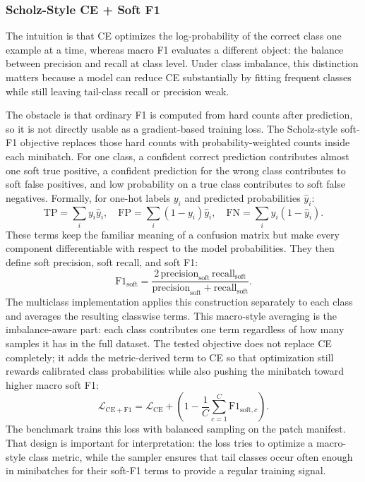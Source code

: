 \documentclass[11pt]{article}
\begin{document}
\subsubsection{Scholz-Style CE + Soft F1}
The intuition is that CE optimizes the log-probability of the correct class one example at a time, whereas macro F1 evaluates a different object: the balance between precision and recall at class level. Under class imbalance, this distinction matters because a model can reduce CE substantially by fitting frequent classes while still leaving tail-class recall or precision weak.

The obstacle is that ordinary F1 is computed from hard counts after prediction, so it is not directly usable as a gradient-based training loss. The Scholz-style soft-F1 objective replaces those hard counts with probability-weighted counts inside each minibatch. For one class, a confident correct prediction contributes almost one soft true positive, a confident prediction for the wrong class contributes to soft false positives, and low probability on a true class contributes to soft false negatives. Formally, for one-hot labels $y_i$ and predicted probabilities $\hat{y}_i$:
\begin{equation}
  \mathrm{TP}=\sum_i y_i\hat{y}_i,\quad
  \mathrm{FP}=\sum_i (1-y_i)\hat{y}_i,\quad
  \mathrm{FN}=\sum_i y_i(1-\hat{y}_i).
  \label{eq:soft-confusion-f1}
\end{equation}
\noindent These terms keep the familiar meaning of a confusion matrix but make every component differentiable with respect to the model probabilities. They then define soft precision, soft recall, and soft F1:
\begin{equation}
  \mathrm{F1}_{\mathrm{soft}} =
  \frac{2\,\mathrm{precision}_{\mathrm{soft}}\,\mathrm{recall}_{\mathrm{soft}}}
       {\mathrm{precision}_{\mathrm{soft}}+\mathrm{recall}_{\mathrm{soft}}}.
  \label{eq:soft-f1}
\end{equation}
\noindent The multiclass implementation applies this construction separately to each class and averages the resulting classwise terms. This macro-style averaging is the imbalance-aware part: each class contributes one term regardless of how many samples it has in the full dataset. The tested objective does not replace CE completely; it adds the metric-derived term to CE so that optimization still rewards calibrated class probabilities while also pushing the minibatch toward higher macro soft F1:
\begin{equation}
  \mathcal{L}_{\mathrm{CE+F1}} = \mathcal{L}_{\mathrm{CE}} +
  \left(1-\frac{1}{C}\sum_{c=1}^{C}\mathrm{F1}_{\mathrm{soft},c}\right).
  \label{eq:ce-soft-f1}
\end{equation}
\noindent The benchmark trains this loss with balanced sampling on the patch manifest. That design is important for interpretation: the loss tries to optimize a macro-style class metric, while the sampler ensures that tail classes occur often enough in minibatches for their soft-F1 terms to provide a regular training signal.
\end{document}
